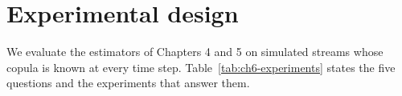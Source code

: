 %
\section{Experimental design}\label{sec:ch6-design}

We evaluate the estimators of Chapters 4 and 5 on simulated streams whose copula is known at every time step.
Table~\ref{tab:ch6-experiments} states the five questions and the experiments that answer them.

